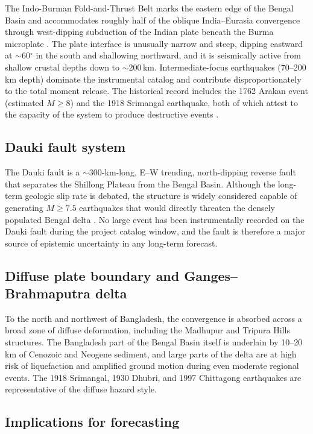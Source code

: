\documentclass[10pt,a4paper,twocolumn]{article}
\begin{document}
The Indo-Burman Fold-and-Thrust Belt marks the eastern edge of the Bengal Basin and accommodates roughly half of the oblique India--Eurasia convergence through west-dipping subduction of the Indian plate beneath the Burma microplate \cite{steckler2008, ni1989}. The plate interface is unusually narrow and steep, dipping eastward at $\sim$60$^\circ$ in the south and shallowing northward, and it is seismically active from shallow crustal depths down to $\sim$200\,km. Intermediate-focus earthquakes (70--200\,km depth) dominate the instrumental catalog and contribute disproportionately to the total moment release. The historical record includes the 1762 Arakan event (estimated $M\geq8$) and the 1918 Srimangal earthquake, both of which attest to the capacity of the system to produce destructive events \cite{wang2013}.

\subsection{Dauki fault system}

The Dauki fault is a $\sim$300-km-long, E--W trending, north-dipping reverse fault that separates the Shillong Plateau from the Bengal Basin. Although the long-term geologic slip rate is debated, the structure is widely considered capable of generating $M\geq7.5$ earthquakes that would directly threaten the densely populated Bengal delta \cite{wang2013}. No large event has been instrumentally recorded on the Dauki fault during the project catalog window, and the fault is therefore a major source of epistemic uncertainty in any long-term forecast.

\subsection{Diffuse plate boundary and Ganges--Brahmaputra delta}

To the north and northwest of Bangladesh, the convergence is absorbed across a broad zone of diffuse deformation, including the Madhupur and Tripura Hills structures. The Bangladesh part of the Bengal Basin itself is underlain by 10--20\,km of Cenozoic and Neogene sediment, and large parts of the delta are at high risk of liquefaction and amplified ground motion during even moderate regional events. The 1918 Srimangal, 1930 Dhubri, and 1997 Chittagong earthquakes are representative of the diffuse hazard style.

\subsection{Implications for forecasting}
\end{document}
